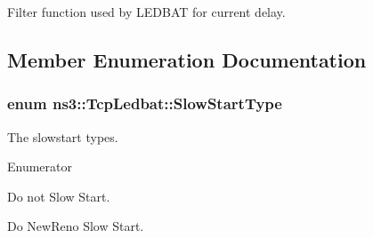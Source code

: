 Filter function used by L\+E\+D\+B\+AT for current delay. 



\subsection{Member Enumeration Documentation}
\subsubsection[{\texorpdfstring{Slow\+Start\+Type}{SlowStartType}}]{\setlength{\rightskip}{0pt plus 5cm}enum {\bf ns3\+::\+Tcp\+Ledbat\+::\+Slow\+Start\+Type}\hspace{0.3cm}{\ttfamily [private]}}\hypertarget{classns3_1_1TcpLedbat_a7099bb59b406b311fab27960df7c8620}{}\label{classns3_1_1TcpLedbat_a7099bb59b406b311fab27960df7c8620}


The slowstart types. 

\begin{Desc}
\item[Enumerator]\par
\begin{description}
\item[{\em 
D\+O\+\_\+\+N\+O\+T\+\_\+\+S\+L\+O\+W\+S\+T\+A\+RT\hypertarget{classns3_1_1TcpLedbat_a7099bb59b406b311fab27960df7c8620ac4ed97ba794665876b847c01dd9c84e9}{}\label{classns3_1_1TcpLedbat_a7099bb59b406b311fab27960df7c8620ac4ed97ba794665876b847c01dd9c84e9}
}]Do not Slow Start. \item[{\em 
D\+O\+\_\+\+S\+L\+O\+W\+S\+T\+A\+RT\hypertarget{classns3_1_1TcpLedbat_a7099bb59b406b311fab27960df7c8620aff8b53c555fefc60284c7bd4301c002f}{}\label{classns3_1_1TcpLedbat_a7099bb59b406b311fab27960df7c8620aff8b53c555fefc60284c7bd4301c002f}
}]Do New\+Reno Slow Start. \end{description}
\end{Desc}

